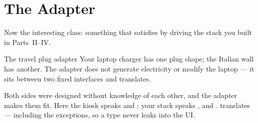 \section{The Adapter}

Now the interesting class: something that satisfies  by
driving the stack you built in Parts~II--IV.

\begin{analogy}{The travel plug adapter}
Your laptop charger has one plug shape; the Italian wall has another. The adapter
does not generate electricity or modify the laptop --- it sits between two fixed
interfaces and translates.

Both sides were designed without knowledge of each other, and the adapter makes
them fit. Here the kiosk speaks  and ;
your stack speaks ,  and
.  translates --- including the
exceptions, so a  type never leaks into the UI.
\end{analogy}

